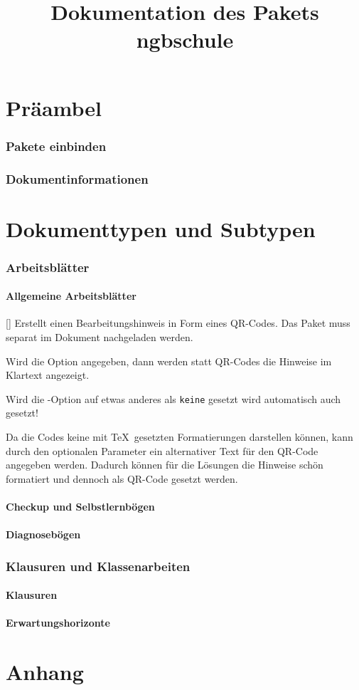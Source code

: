 \documentclass[a4paper,add-index,ngerman]{cnltx-doc}
\title{Dokumentation des Pakets ngbschule}
\begin{document}


\part{Präambel}
\section{Pakete einbinden}
\section{Dokumentinformationen}



\part{Dokumenttypen und Subtypen}
\section{Arbeitsblätter}
\subsection{Allgemeine Arbeitsblätter}
\begin{commands}
	[]
	Erstellt einen Bearbeitungshinweis in Form eines QR-Codes. Das Paket  muss separat im Dokument nachgeladen werden.
	
	Wird die Option  angegeben, dann werden statt QR-Codes die Hinweise im Klartext angezeigt.
	
	Wird die -Option  auf etwas anderes als \texttt{keine} gesetzt wird automatisch auch  gesetzt!
	
	Da die Codes keine mit \TeX\ gesetzten Formatierungen darstellen können, kann durch den optionalen Parameter  ein alternativer Text für den QR-Code angegeben werden. Dadurch können für die Lösungen die Hinweise schön formatiert und dennoch als QR-Code gesetzt werden.
\end{commands}

\subsection{Checkup und Selbstlernbögen}
\subsection{Diagnosebögen}

\section{Klausuren und Klassenarbeiten}
\subsection{Klausuren}
\subsection{Erwartungshorizonte}



\part{Anhang}
\end{document}
